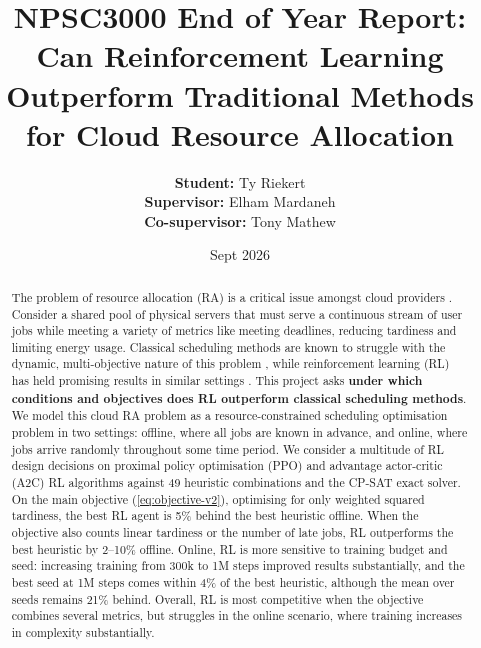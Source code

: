 \documentclass[12pt]{article}
\title{NPSC3000 End of Year Report: Can Reinforcement Learning Outperform Traditional Methods for Cloud Resource Allocation}
\author{
\textbf{Student:} Ty Riekert \\
\textbf{Supervisor:} Elham Mardaneh \\
\textbf{Co-supervisor:} Tony Mathew
}
\date{Sept 2026}
\begin{document}
\maketitle
\begin{abstract}
The problem of resource allocation (RA) is a critical issue amongst cloud providers \cite{saidi2023, sdn2021, vinothina2012, parikh2013, mohamaddiah2014}. Consider a shared pool of physical servers that must serve a continuous stream of user jobs while meeting a variety of metrics like meeting deadlines, reducing tardiness and limiting energy usage. Classical scheduling methods are known to struggle with the dynamic, multi-objective nature of this problem \cite{lbts2024, 10854610, DAHMANI2025100616}, while reinforcement learning (RL) has held promising results in similar settings \cite{saidi2023, autoscaling2023, lbts2024, dynamic2026}. This project asks \textbf{under which conditions and objectives does RL outperform classical scheduling methods}. We model this cloud RA problem as a resource-constrained scheduling optimisation problem in two settings: offline, where all jobs are known in advance, and online, where jobs arrive randomly throughout some time period. We consider a multitude of RL design decisions on proximal policy optimisation (PPO) and advantage actor-critic (A2C) RL algorithms against 49 heuristic combinations and the CP-SAT exact solver. On the main objective (\cref{eq:objective-v2}), optimising for only weighted squared tardiness, the best RL agent is 5\% behind the best heuristic offline. When the objective also counts linear tardiness or the number of late jobs, RL outperforms the best heuristic by 2--10\% offline. Online, RL is more sensitive to training budget and seed: increasing training from 300k to 1M steps improved results substantially, and the best seed at 1M steps comes within 4\% of the best heuristic, although the mean over seeds remains 21\% behind. Overall, RL is most competitive when the objective combines several metrics, but struggles in the online scenario, where training increases in complexity substantially.
\end{abstract}

\newpage
\end{document}

